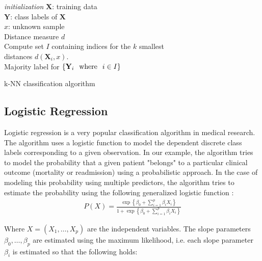 \documentclass[../thesis.tex]{subfiles}
\begin{document}
\begin{algorithm}[H]{
\SetAlgoLined
\textit{initialization}\;
    \hspace{0.5cm} $\mathbf{X}$: training data\\
    \hspace{0.5cm} $\mathbf{Y}$: class labels of $\mathbf{X}$\\
    \hspace{0.5cm} $x$: unknown sample\\
    \hspace{0.5cm} Distance measure $d$\\
    Compute set $I$ containing indices for the $k$ smallest\\
    \hspace*{0,5cm}distances $d(\mathbf{X}_i, x)$.\\
    \Return Majority label for $\left\{ \mathbf{Y}_i \hspace{0.25cm} \text{where} \hspace{0.25cm} i \in I \right\}$
}
\caption{k-NN classification algorithm}
\end{algorithm}


\subsection{Logistic Regression}
\label{subsec:logr}

\noindent Logistic regression is a very popular classification algorithm in medical research. The algorithm uses a logistic function to model the dependent discrete class labels corresponding to a given observation. In our example, the algorithm tries to model the probability that a given patient "belongs" to a particular clinical outcome (mortality or readmission) using a probabilistic approach. In the case of modeling this probability using multiple predictors, the algorithm tries to estimate the probability using the following generalized logistic function \citep{friedman2009elements}:
\begin{align}
    P(X) = \frac{\exp \left\{\beta_0 + \sum_{i=1}^p\beta_iX_i \right\}}{1 +\exp \left\{\beta_0 + \sum_{i=1}^p\beta_iX_i \right\}}
    \label{eq:logr}
\end{align}

\noindent Where $X = \left(X_1, \hdots, X_p \right)$ are the independent variables. The slope parameters $\beta_0, \hdots, \beta_p$ are estimated using the maximum likelihood, i.e. each slope parameter $\beta_i$ is estimated so that the following holds:
\end{document}
